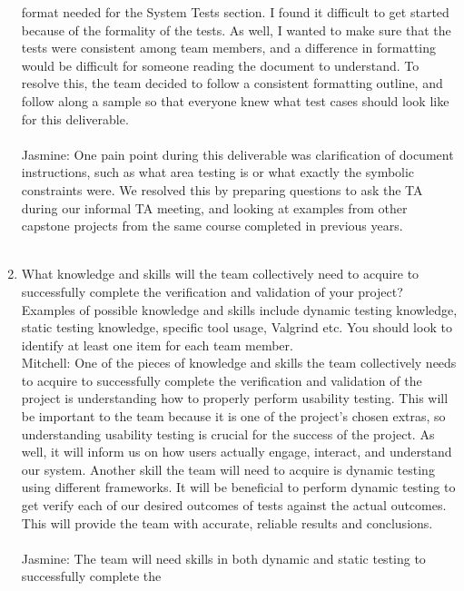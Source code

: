 \documentclass[12pt, titlepage]{article}
\begin{document}
\begin{enumerate}
  format needed for the System Tests section. I found it difficult to get started because of the formality
  of the tests. As well, I wanted to make sure that the tests were consistent among team members, and a difference
  in formatting would be difficult for someone reading the document to understand. To resolve this, the team decided
  to follow a consistent formatting outline, and follow along a sample so that everyone knew what test cases
  should look like for this deliverable.\\\\
  \hspace{2em} Jasmine: One pain point during this deliverable was clarification of document instructions, 
  such as what area testing is or what exactly the symbolic constraints were. We resolved this by preparing 
  questions to ask the TA during our informal TA meeting, and looking at examples from other capstone projects 
  from the same course completed in previous years.\\\\
  \item What knowledge and skills will the team collectively need to acquire to
  successfully complete the verification and validation of your project?
  Examples of possible knowledge and skills include dynamic testing knowledge,
  static testing knowledge, specific tool usage, Valgrind etc.  You should look to
  identify at least one item for each team member.\\
  \newline
  \hspace{2em} Mitchell: One of the pieces of knowledge and skills the team collectively needs to acquire to 
  successfully complete the verification and validation of the project is understanding how to properly perform
  usability testing. This will be important to the team because it is one of the project's chosen extras, so understanding
  usability testing is crucial for the success of the project. As well, it will inform us on how users actually engage,
  interact, and understand our system. Another skill the team will need to acquire is dynamic testing using different frameworks.
  It will be beneficial to perform dynamic testing to get verify each of our desired outcomes of tests against the actual outcomes.
  This will provide the team with accurate, reliable results and conclusions.\\\\
  \hspace{2em} Jasmine: The team will need skills in both dynamic and static testing to successfully complete the 

\end{enumerate}
\end{document}
